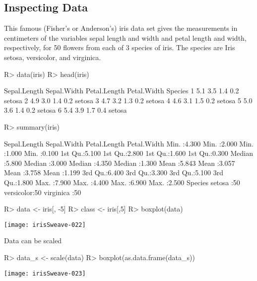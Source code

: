 \documentclass[fleqn, letter, 10pt]{article}
\begin{document}
\subsection{Inspecting Data}


This famous (Fisher's or Anderson's) iris data set gives the
measurements in centimeters of the variables sepal length and
width and petal length and width, respectively, for 50 flowers
from each of 3 species of iris.  The species are Iris setosa,
     versicolor, and virginica.



\begin{Schunk}
\begin{Sinput}
R> data(iris)
R> head(iris)
\end{Sinput}
\begin{Soutput}
  Sepal.Length Sepal.Width Petal.Length Petal.Width Species
1          5.1         3.5          1.4         0.2  setosa
2          4.9         3.0          1.4         0.2  setosa
3          4.7         3.2          1.3         0.2  setosa
4          4.6         3.1          1.5         0.2  setosa
5          5.0         3.6          1.4         0.2  setosa
6          5.4         3.9          1.7         0.4  setosa
\end{Soutput}
\begin{Sinput}
R> summary(iris)
\end{Sinput}
\begin{Soutput}
  Sepal.Length    Sepal.Width     Petal.Length    Petal.Width   
 Min.   :4.300   Min.   :2.000   Min.   :1.000   Min.   :0.100  
 1st Qu.:5.100   1st Qu.:2.800   1st Qu.:1.600   1st Qu.:0.300  
 Median :5.800   Median :3.000   Median :4.350   Median :1.300  
 Mean   :5.843   Mean   :3.057   Mean   :3.758   Mean   :1.199  
 3rd Qu.:6.400   3rd Qu.:3.300   3rd Qu.:5.100   3rd Qu.:1.800  
 Max.   :7.900   Max.   :4.400   Max.   :6.900   Max.   :2.500  
       Species  
 setosa    :50  
 versicolor:50  
 virginica :50  
\end{Soutput}
\begin{Sinput}
R> data <- iris[, -5]
R> class <- iris[,5]
R> boxplot(data)
\end{Sinput}
\end{Schunk}
\texttt{[image: irisSweave-022]}

Data can be scaled
\begin{Schunk}
\begin{Sinput}
R> data_s <- scale(data)
R> boxplot(as.data.frame(data_s))
\end{Sinput}
\end{Schunk}
\texttt{[image: irisSweave-023]}
\end{document}
